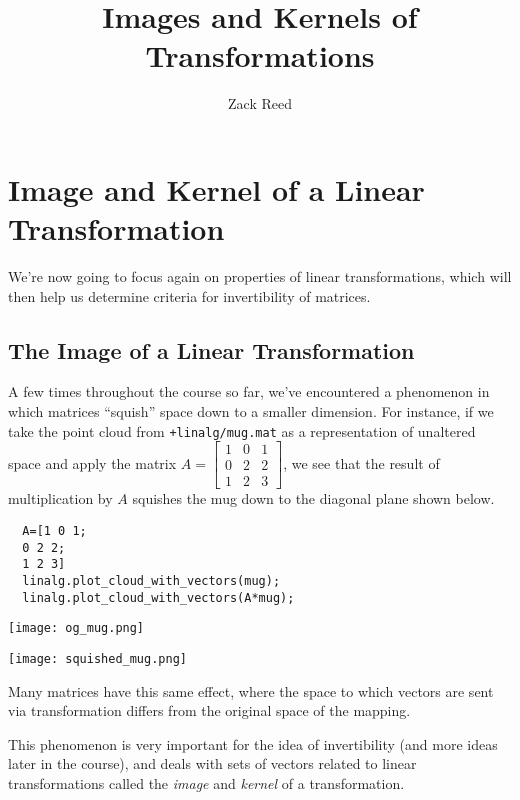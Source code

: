 \documentclass{ximera}
\author{Zack Reed}
\title{Images and Kernels of Transformations}
\begin{document}
\begin{abstract}

\end{abstract}
\maketitle


\section*{Image and Kernel of a Linear Transformation}

We're now going to focus again on properties of linear transformations, which will then help us determine criteria for invertibility of matrices.

\subsection*{The Image of a Linear Transformation}

A few times throughout the course so far, we've encountered a phenomenon in which matrices ``squish'' space down to a smaller dimension. For instance, if we take the point cloud from \texttt{+linalg/mug.mat} as a representation of unaltered space and apply the matrix $A=\begin{bmatrix}
  1&0&1\\0&2&2\\1&2&3
\end{bmatrix}$, we see that the result of multiplication by $A$ squishes the mug down to the diagonal plane shown below. 

\begin{verbatim}
  A=[1 0 1;
  0 2 2;
  1 2 3]
  linalg.plot_cloud_with_vectors(mug);
  linalg.plot_cloud_with_vectors(A*mug);
\end{verbatim}


\begin{center}
  \texttt{[image: og\_mug.png]}
\end{center}

\begin{center}
  \texttt{[image: squished\_mug.png]}
\end{center}

Many matrices have this same effect, where the space to which vectors are sent via transformation differs from the original space of the mapping. 

This phenomenon is very important for the idea of invertibility (and more ideas later in the course), and deals with sets of vectors related to linear transformations called the \emph{image} and \emph{kernel} of a transformation.
\end{document}
